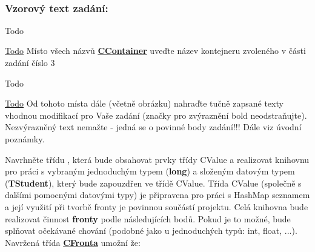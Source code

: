 ~\newline
\subsubsection*{Vzorový text zadání\+:}

\begin{DoxyRefDesc}{Todo}
\item[\hyperlink{todo__todo000002}{Todo}]Místo všech názvů {\bfseries  {\ttfamily \hyperlink{class_c_container}{C\+Container}}} uveďte název kontejneru zvoleného v části zadání číslo 3\end{DoxyRefDesc}


\begin{DoxyRefDesc}{Todo}
\item[\hyperlink{todo__todo000003}{Todo}]Od tohoto místa dále (včetně obrázku) nahraďte tučně zapsané texty vhodnou modifikací pro Vaše zadání (značky pro zvýraznění bold neodstraňujte). Nezvýrazněný text nemažte -\/ jedná se o povinné body zadání!!! Dále viz úvodní poznámky.\end{DoxyRefDesc}


Navrhněte třídu {}, která bude obsahovat prvky třídy {\ttfamily C\+Value} a realizovat knihovnu pro práci s vybraným jednoduchým typem ({\bfseries long}) a složeným datovým typem ({\bfseries T\+Student}), který bude zapouzdřen ve třídě {\ttfamily C\+Value}. Třída {\ttfamily C\+Value} (společně s dalšími pomocnými datovými typy) je připravena pro práci s Hash\+Map seznamem a její využití při tvorbě fronty je povinnou součástí projektu. Celá knihovna bude realizovat činnost {\bfseries fronty} podle následujících bodů. Pokud je to možné, bude splňovat očekávané chování (podobné jako u jednoduchých typů\+: {\ttfamily int}, {\ttfamily float}, ...). Navržená třída {\bfseries \hyperlink{class_c_fronta}{C\+Fronta}} umožní že\+:


